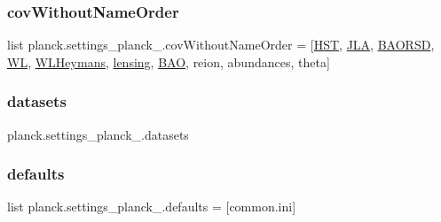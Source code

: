 \subsubsection{\texorpdfstring{cov\+Without\+Name\+Order}{covWithoutNameOrder}}
{\footnotesize\ttfamily list planck.\+settings\+\_\+planck\+\_.\+cov\+Without\+Name\+Order = \mbox{[}\mbox{\hyperlink{namespaceplanck_1_1settings__planck__2015_a07bbdc37cac88460480c8e0389b1c0a2}{H\+ST}}, \textquotesingle{}\mbox{\hyperlink{namespaceplanck_1_1settings__planck__2015_a228e145e679385378b71ad2948b85ba1}{J\+LA}}\textquotesingle{}, \mbox{\hyperlink{namespaceplanck_1_1settings__planck__2015_aa1979503708bc66f1a5ca6c26181194a}{B\+A\+O\+R\+SD}}, \textquotesingle{}\mbox{\hyperlink{namespaceplanck_1_1settings__planck__2015_aa1d1a83b8a1a78949591d158a6ed5188}{WL}}\textquotesingle{}, \textquotesingle{}\mbox{\hyperlink{namespaceplanck_1_1settings__planck__2015_a3c67b8a390704c0dd6d3ee12ba851a4b}{W\+L\+Heymans}}\textquotesingle{}, \textquotesingle{}\mbox{\hyperlink{namespaceplanck_1_1settings__planck__2015_ad92b077f23ecca52bf992daa771c2686}{lensing}}\textquotesingle{}, \textquotesingle{}\mbox{\hyperlink{namespaceplanck_1_1settings__planck__2015_a13c1148a7d97e3efecfd5232156a362b}{B\+AO}}\textquotesingle{}, \textquotesingle{}reion\textquotesingle{}, \textquotesingle{}abundances\textquotesingle{}, \textquotesingle{}theta\textquotesingle{}\mbox{]}}

\mbox{\label{namespaceplanck_1_1settings__planck__2015_aa13afadb6840cd2d5e6244fbc2c0b96e}} 
\subsubsection{\texorpdfstring{datasets}{datasets}}
{\footnotesize\ttfamily planck.\+settings\+\_\+planck\+\_.\+datasets}

\mbox{\label{namespaceplanck_1_1settings__planck__2015_a76020acd97e6bc7d95a924bb809400fb}} 
\subsubsection{\texorpdfstring{defaults}{defaults}}
{\footnotesize\ttfamily list planck.\+settings\+\_\+planck\+\_.\+defaults = \mbox{[}\textquotesingle{}common.\+ini\textquotesingle{}\mbox{]}}

